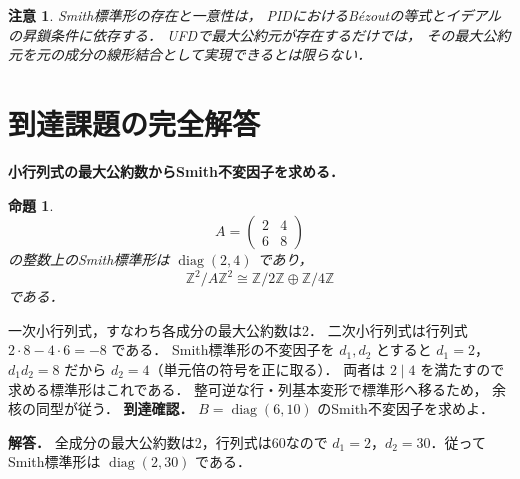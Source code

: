 \documentclass[a5paper,10pt,onecolumn]{jsarticle}
\makeatletter
\theoremstyle{mathnotetheorem}
\newtheorem{proposition}[theorem]{命題}
\newtheorem{remark}[theorem]{注意}
\renewcommand{\proofname}{証明}
\renewenvironment{proof}[1][\proofname]{%
  \par\pushQED{\qed}\normalfont\topsep4\p@\@plus2\p@\relax
  \trivlist\item[\hskip\labelsep\bfseries #1]\ignorespaces
}{\popQED\endtrivlist\@endpefalse}
\makeatother
\begin{document}
\begin{remark}
Smith標準形の存在と一意性は，
PIDにおけるB\'ezoutの等式とイデアルの昇鎖条件に依存する．
UFDで最大公約元が存在するだけでは，
その最大公約元を元の成分の線形結合として実現できるとは限らない．
\end{remark}


\section{到達課題の完全解答}
\noindent\textbf{小行列式の最大公約数からSmith不変因子を求める．}
\begin{proposition}
\[
A=\begin{pmatrix}2&4\\6&8\end{pmatrix}
\]
の整数上のSmith標準形は
$\operatorname{diag}(2,4)$ であり，
\[
\mathbb Z^2/A\mathbb Z^2
\cong\mathbb Z/2\mathbb Z\oplus\mathbb Z/4\mathbb Z
\]
である．
\end{proposition}
\begin{proof}
一次小行列式，すなわち各成分の最大公約数は2．
二次小行列式は行列式
$2\cdot8-4\cdot6=-8$ である．
Smith標準形の不変因子を $d_1,d_2$ とすると
$d_1=2$，$d_1d_2=8$ だから
$d_2=4$（単元倍の符号を正に取る）．
両者は $2\mid4$ を満たすので
求める標準形はこれである．
整可逆な行・列基本変形で標準形へ移るため，
余核の同型が従う．
\end{proof}
\noindent\textbf{到達確認．}
$B=\operatorname{diag}(6,10)$ のSmith不変因子を求めよ．
\par\noindent\textbf{解答．}
全成分の最大公約数は2，行列式は60なので
$d_1=2$，$d_2=30$．従ってSmith標準形は
$\operatorname{diag}(2,30)$ である．
\end{document}
